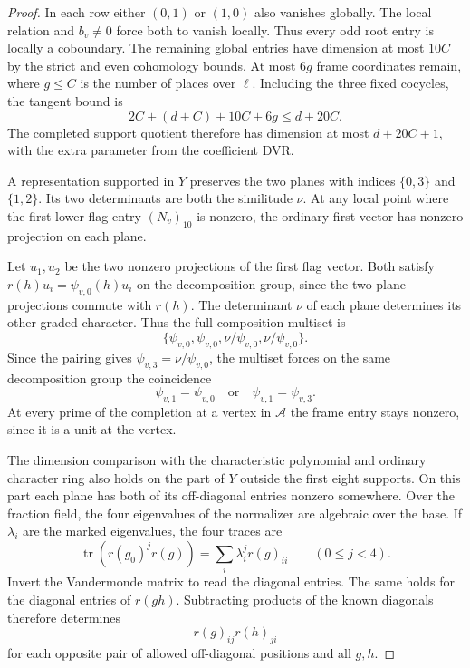 \begin{proof}
In each row either \((0,1)\)
or \((1,0)\) also vanishes globally. The local
relation and \(b_v\ne0\) force both to vanish
locally. Thus every odd root entry is locally
a coboundary. The remaining global entries
have dimension at most \(10C\) by the strict
and even cohomology bounds. At most \(6g\)
frame coordinates remain, where \(g\le C\)
is the number of places over \(\ell\). Including
the three fixed cocycles, the tangent bound is
\[
                   2C+(d+C)+10C+6g\le d+20C .
\]
The completed support quotient therefore has
dimension at most \(d+20C+1\), with the extra
parameter from the coefficient DVR.

A representation supported in \(Y\) preserves
the two planes with indices \(\{0,3\}\) and
\(\{1,2\}\). Its two determinants are both the
similitude \(\nu\).
At any local point where the first lower flag
entry \((N_v)_{10}\) is nonzero, the ordinary first
vector has nonzero projection on each plane.

Let \(u_1,u_2\) be the two nonzero projections of
the first flag vector. Both satisfy
\(r(h)u_i=\psi_{v,0}(h)u_i\) on the decomposition group,
since the two plane projections commute with \(r(h)\).
The determinant \(\nu\) of each plane determines its other
graded character. Thus the full composition multiset is
\[
       \{\psi_{v,0},\psi_{v,0},\nu/\psi_{v,0},\nu/\psi_{v,0}\}.
\]
Since the pairing gives \(\psi_{v,3}=\nu/\psi_{v,0}\),
the multiset forces on the same decomposition group the coincidence
\[
               \psi_{v,1}=\psi_{v,0}\quad\text{or}\quad
               \psi_{v,1}=\psi_{v,3}.
\] At every prime of the completion at a
vertex in \(\mathcal A\) the frame entry stays
nonzero, since it is a unit at the vertex.

The dimension comparison with the characteristic
polynomial and ordinary character ring also holds
on the part of \(Y\) outside the first eight
supports. On this part each plane has both of
its off-diagonal entries nonzero somewhere.
Over the fraction field, the four eigenvalues
of the normalizer are algebraic over the base.
If \(\lambda_i\) are the marked eigenvalues, the four traces are
\[
    \operatorname{tr}(r(g_0)^j r(g))
            =\sum_i\lambda_i^j r(g)_{ii}\qquad(0\le j<4).
\]
Invert the Vandermonde matrix to read the diagonal entries. The same holds for
the diagonal entries of \(r(gh)\).
Subtracting products of the known diagonals
therefore determines
\[
                  r(g)_{ij}r(h)_{ji}
\]
for each opposite pair of allowed off-diagonal
positions and all \(g,h\).


\end{proof}
